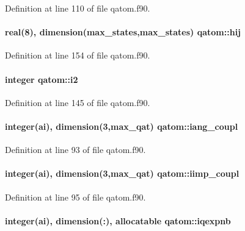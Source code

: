 Definition at line 110 of file qatom.\-f90.

\hypertarget{classqatom_af43d041f4c6cd4cbdcb6a176ff0ecd62}{
\paragraph[{hij}]{\setlength{\rightskip}{0pt plus 5cm}real(8), dimension({\bf max\-\_\-states},{\bf max\-\_\-states}) qatom\-::hij}}\label{classqatom_af43d041f4c6cd4cbdcb6a176ff0ecd62}


Definition at line 154 of file qatom.\-f90.

\hypertarget{classqatom_a9b9c6e05cf898fc0e178dd98559a901b}{
\paragraph[{i2}]{\setlength{\rightskip}{0pt plus 5cm}integer qatom\-::i2}}\label{classqatom_a9b9c6e05cf898fc0e178dd98559a901b}


Definition at line 145 of file qatom.\-f90.

\hypertarget{classqatom_ab5f70e89148ed3cbe2685d0e324e4dc7}{
\paragraph[{iang\-\_\-coupl}]{\setlength{\rightskip}{0pt plus 5cm}integer(ai), dimension(3,{\bf max\-\_\-qat}) qatom\-::iang\-\_\-coupl}}\label{classqatom_ab5f70e89148ed3cbe2685d0e324e4dc7}


Definition at line 93 of file qatom.\-f90.

\hypertarget{classqatom_ac136119a98cb2d0bc7bbaec7becef89f}{
\paragraph[{iimp\-\_\-coupl}]{\setlength{\rightskip}{0pt plus 5cm}integer(ai), dimension(3,{\bf max\-\_\-qat}) qatom\-::iimp\-\_\-coupl}}\label{classqatom_ac136119a98cb2d0bc7bbaec7becef89f}


Definition at line 95 of file qatom.\-f90.

\hypertarget{classqatom_aa99790e204a2a46a0e30dcc5c7db2ff6}{
\paragraph[{iqexpnb}]{\setlength{\rightskip}{0pt plus 5cm}integer(ai), dimension(\-:), allocatable qatom\-::iqexpnb}}\label{classqatom_aa99790e204a2a46a0e30dcc5c7db2ff6}


